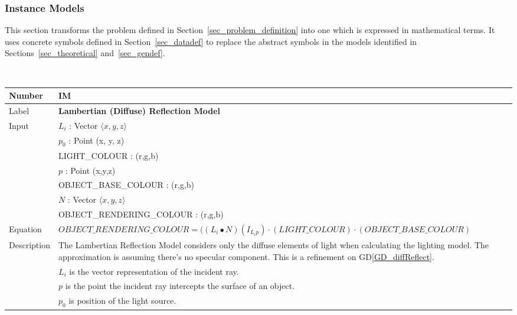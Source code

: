 \documentclass[12pt]{article}
\newcommand{\colAwidth}{0.13\textwidth}
\newcommand{\colBwidth}{0.82\textwidth}
\newcommand{\dref}[1]{GD\ref{#1}}
\newcounter{instnum} %
\begin{document}
\subsubsection{Instance Models} \label{sec_instance}    

This section transforms the problem defined in 
Section~\ref{sec_problem_definition} into one which is expressed in 
mathematical terms. It uses concrete symbols defined in 
Section~\ref{sec_datadef} to replace the abstract symbols in the models 
identified in Sections~\ref{sec_theoretical} and~\ref{sec_gendef}.

~\newline


\noindent
\begin{minipage}{\textwidth}
	\renewcommand*{\arraystretch}{1.5}
	\begin{tabular}{| p{\colAwidth} | p{\colBwidth}|}
		\hline
		\rowcolor[gray]{0.9}
		Number& IM{instnum}\theinstnum \label{IM_LamDiffuse}\\
		\hline
		Label& \bf Lambertian (Diffuse) Reflection Model\\
		\hline
		\multirow{7}{*}{Input}& $L_{i}$ : Vector $\langle x, y, z \rangle$ \\
		& $p_{0}$ : Point (x, y, z) \\
		& LIGHT\_COLOUR : (r,g,b)\\
		& $p$ : Point (x,y,z) \\ 
		& OBJECT\_BASE\_COLOUR : (r,g,b)\\
		& $N$ : Vector $\langle x, y, z \rangle$ \\
		\hline
		\multirow{2}{*}{Output}& OBJECT\_RENDERING\_COLOUR : (r,g,b) \\
		\hline
		Equation & $OBJECT\_RENDERING\_COLOUR = 
		((L_{i} \bullet 
		N)(I_{L_{i}p})\cdot(LIGHT\_COLOUR)\cdot(OBJECT\_BASE\_COLOUR)$
		 \\
		\hline
		\multirow{7}{*}{Description} & The Lambertian Reflection Model 
		considers only the 
		diffuse elements of light when calculating the lighting model. The 
		approximation is assuming there's no specular component. This is a 
		refinement on \dref{GD_diffReflect}.\\
		& $L_{i}$ is the vector representation of the incident 
		ray.\\
		& $p$ is the point the incident ray intercepts the surface of an 
		object. \\
		& $p_{0}$ is position of the light source. \\		

\end{tabular}
\end{minipage}
\end{document}

